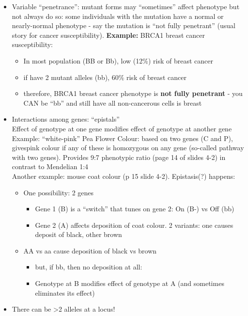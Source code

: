 \documentclass{scrartcl}
\begin{document}
\begin{itemize}
\item Variable ``penetrance'': mutant forms may ``sometimes'' affect phenotype but not always do so: some individuals with the mutation have a normal or nearly-normal phenotype - say the mutation is ``not fully penetrant'' (usual story for cancer susceptibility).
  {\bf Example: } BRCA1 breast cancer susceptibility:
  \begin{itemize}
  \item In most population (BB or Bb), low (12\%) risk of breast cancer
  \item if have 2 mutant alleles (bb), 60\% risk of breast cancer
  \item therefore, BRCA1 breast cancer phenotype is {\bf not fully penetrant} - you CAN be ``bb'' and still have all non-cancerous cells is breast
  \end{itemize}
\item Interactions among genes: ``epistals''\\
  Effect of genotype at one gene modifies effect of genotype at another gene
  Example: ``white-pink'' Pea Flower Colour: based on two genes (C and P), givespink colour if any of these is homozygous on any gene (so-called pathway with two genes).
  Provides 9:7 phenotypic ratio (page 14 of slides 4-2) in contrast to Mendelian 1:4\\
  Another example: mouse coat colour (p 15 slide 4-2).
  Epistasis(?) happens:
  \begin{itemize}
  \item One possibility: 2 genes
    \begin{itemize}
    \item Gene 1 (B) is a ``switch'' that tunes on gene 2: On (B-) vs Off (bb)
    \item Gene 2 (A) affects deposition of coat colour. 2 variants: one causes deposit of black, other brown
    \end{itemize}
  \item AA vs aa cause deposition of black vs brown
    \begin{itemize}
    \item but, if bb, then no deposition at all:
    \item Genotype at B modifies effect of genotype at A (and sometimes eliminates its effect)
    \end{itemize}
  \end{itemize}
\item There can be >2 alleles at a locus!\\

\end{itemize}
\end{document}

